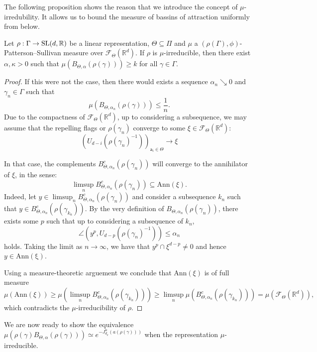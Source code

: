 \documentclass{report}
\begin{document}
The following proposition shows the reason that we introduce the concept of $\mu$-irredubility.
It allows us to bound the measure of bassins of attraction uniformly from below.
\begin{proposition}\label{prop:irreducibility}
    Let $\rho: \Gamma \to \operatorname{{\mathrm{SL}}}(d,\mathbb R)$ be a linear representation, $\Theta \subseteq \Pi$ and $\mu$ a $(\rho(\Gamma), \phi)$-Patterson--Sullivan measure over $\mathcal F_\Theta(\mathbb R^d)$.
    If $\rho$ is $\mu$-irreducible, then there exist $\alpha, \kappa > 0$ such that $\mu(B_{\Theta, \alpha}(\rho(\gamma))) \geq k$ for all $\gamma \in \Gamma$.
\end{proposition}
\begin{proof}
    If this were not the case, then there would exists a sequence $\alpha_n \searrow 0$ and $\gamma_n \in \Gamma$ such that
    \[
        \mu(B_{\Theta, \alpha_n}(\rho(\gamma))) \leq \frac{1}{n}.
    \]
    Due to the compactness of $\mathcal F_{\Theta} (\mathbb R^d)$, up to considering a subsequence, we may assume that the repelling flags or $\rho(\gamma_n)$ converge to some $\xi \in \mathcal F_{\Theta} (\mathbb R^d)$:
    \[
        (U_{d-i}(\rho(\gamma_n)^{-1}))_{\mathsf a_i \in \Theta} \to \xi
    \]
    
    In that case, the complements $B_{\Theta, \alpha_n}^c(\rho(\gamma_n))$ will converge to the annihilator of $\xi$, in the sense:
    \[
        \limsup_n B_{\Theta, \alpha_n}^c(\rho(\gamma_n)) \subseteq \mathrm{Ann}(\xi).
    \]
    Indeed, let $y\in \limsup_n  B_{\Theta, \alpha_n}^c(\rho(\gamma_n))$ and consider a subsequence $k_n$ such that $y\in B_{\Theta, \alpha_n}^c(\rho(\gamma_{k_n}))$.
    By the very definition of $B_{\Theta, \alpha_n}(\rho(\gamma_n))$, there exists some $p$ such that up to considering a subsequence of $k_n$,
    \[
        \angle (y^p, U_{d-p}(\rho(\gamma_n)^{-1})) \leq \alpha_n
    \]
    holds.
    Taking the limit as $n \to \infty$, we have that $y^p \cap \xi^{d-p} \neq 0$ and hence $y \in \mathrm{Ann(\xi)}$.

    Using a measure-theoretic arguement we conclude that $\mathrm{Ann}(\xi)$ is of full measure
    \[
        \mu(\mathrm{Ann}(\xi)) \geq
        \mu (\limsup_n B_{\Theta, \alpha_n}^c(\rho(\gamma_{k_n})) ) \geq 
        \limsup_n \mu (B_{\Theta, \alpha_n}^c(\rho(\gamma_{k_n}))) =
        \mu(\mathcal F_\Theta (\mathbb R^d)),
    \]
    which contradicts the $\mu$-irreducibility of $\rho$.
\end{proof}
We are now ready to show the equivalence $\mu(\rho(\gamma)B_{\Theta, \alpha}(\rho(\gamma))) \simeq e^{-J^u_{d_\rho}(a(\rho(\gamma)))}$ when the representation $\mu$-irreducible.
\end{document}
